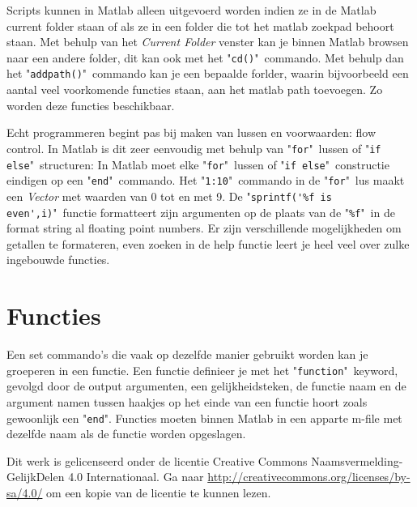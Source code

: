 \documentclass[11pt,twoside]{article}
\begin{document}
Scripts kunnen in Matlab alleen uitgevoerd worden indien ze in de Matlab current folder staan of als ze in een folder die tot het matlab zoekpad behoort staan. Met behulp van het \emph{Current Folder} venster kan je binnen Matlab browsen naar een andere folder, dit kan ook met het "\lstinline{cd()}"\ commando. Met behulp dan het "\lstinline{addpath()}"\ commando kan je een bepaalde forlder, waarin bijvoorbeeld een aantal veel voorkomende functies staan, aan het matlab path toevoegen. Zo worden deze functies beschikbaar.

Echt programmeren begint pas bij maken van lussen en voorwaarden: flow control. In Matlab is dit zeer eenvoudig met behulp van "\lstinline{for}"\ lussen of "\lstinline{if else}"\ structuren:
 In Matlab moet elke "\lstinline{for}"\ lussen of "\lstinline{if else}"\ constructie eindigen op een "\lstinline{end}"\ commando.
Het "\lstinline{1:10}"\ commando in de "\lstinline{for}"\ lus maakt een \emph{Vector} met waarden van 0 tot en met 9. De "\lstinline{sprintf('%f is even',i)}"\ functie formatteert zijn argumenten op de plaats van de "\lstinline{%f}"\ in de format string al floating point numbers. Er zijn verschillende mogelijkheden om getallen te formateren, even zoeken in de help functie leert je heel veel over zulke ingebouwde functies.

	\section{Functies}
Een set commando's die vaak op dezelfde manier gebruikt worden kan je groeperen in een functie. Een functie definieer je met het "\lstinline{function}"\ keyword, gevolgd door de output argumenten, een gelijkheidsteken, de functie naam en de argument namen tussen haakjes op het einde van een functie hoort zoals gewoonlijk een "\lstinline{end}". Functies moeten binnen Matlab in een apparte m-file met dezelfde naam als de functie worden opgeslagen.





Dit werk is gelicenseerd onder de licentie Creative Commons Naamsvermelding-GelijkDelen 4.0 Internationaal. Ga naar \url{http://creativecommons.org/licenses/by-sa/4.0/} om een kopie van de licentie te kunnen lezen.
\vspace{1cm}
\end{document}
